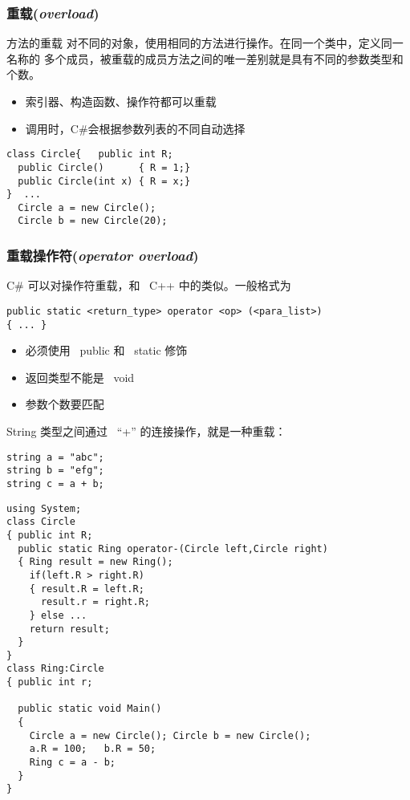 \begin{frame}[fragile]
\frametitle{重载(\textit{overload})}
\begin{block}{方法的重载}
  \CJKindent 对不同的对象，使用相同的方法进行操作。在同一个类中，定义同一名称的
  多个成员，被重载的成员方法之间的唯一差别就是具有不同的参数类型和个数。
\end{block}
\pause
\begin{itemize}
\item 索引器、构造函数、操作符都可以重载
\item 调用时，C\#会根据参数列表的不同自动选择
\end{itemize}
\pause
\begin{lstlisting}[escapeinside=<>]
class Circle{   public int R;
  public Circle()      { R = 1;}
  public Circle(int x) { R = x;}
}  ...
  Circle a = new Circle();
  Circle b = new Circle(20);
\end{lstlisting}
\end{frame}

\begin{frame}[fragile]
\frametitle{重载操作符(\textit{operator overload})}
C\# 可以对操作符重载，和 ~C++ 中的类似。一般格式为
\pause
\begin{lstlisting}
public static <return_type> operator <op> (<para_list>)
{ ... }
\end{lstlisting}
\pause
\begin{itemize}
\item 必须使用 ~public 和 ~static 修饰
\item 返回类型不能是 ~void
\item 参数个数要匹配
\end{itemize}
\pause
String 类型之间通过 ~``+'' 的连接操作，就是一种重载：
\begin{lstlisting}
string a = "abc";
string b = "efg";
string c = a + b;
\end{lstlisting}
\end{frame}

\begin{frame}
\begin{lstlisting}
using System;
class Circle
{ public int R;
  public static Ring operator-(Circle left,Circle right)
  { Ring result = new Ring();
    if(left.R > right.R)
    { result.R = left.R;
      result.r = right.R;
    } else ...
    return result;
  }
}
class Ring:Circle
{ public int r;

  public static void Main()
  {
    Circle a = new Circle(); Circle b = new Circle();
    a.R = 100;   b.R = 50;
    Ring c = a - b;
  }
}
\end{lstlisting}
\end{frame}

